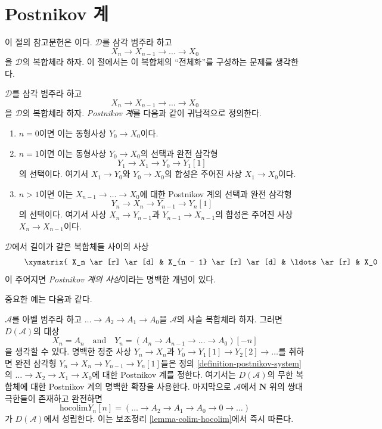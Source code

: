 \section{Postnikov 계}
\label{section-postnikov}

\noindent
이 절의 참고문헌은 \cite{Orlov-K3}이다. $\mathcal{D}$를 삼각 범주라
하고
$$
X_n \to X_{n - 1} \to \ldots \to X_0
$$
을 $\mathcal{D}$의 복합체라 하자. 이 절에서는 이 복합체의
``전체화''를 구성하는 문제를 생각한다.

\begin{definition}
\label{definition-postnikov-system}
$\mathcal{D}$를 삼각 범주라 하고
$$
X_n \to X_{n - 1} \to \ldots \to X_0
$$
을 $\mathcal{D}$의 복합체라 하자. {\it Postnikov 계}를 다음과 같이
귀납적으로 정의한다.
\begin{enumerate}
\item $n = 0$이면 이는 동형사상 $Y_0 \to X_0$이다.
\item $n = 1$이면 이는 동형사상 $Y_0 \to X_0$의 선택과 완전 삼각형
$$
Y_1 \to X_1 \to Y_0 \to Y_1[1]
$$
의 선택이다. 여기서 $X_1 \to Y_0$와 $Y_0 \to X_0$의 합성은 주어진
사상 $X_1 \to X_0$이다.
\item $n > 1$이면 이는 $X_{n - 1} \to \ldots \to X_0$에 대한
Postnikov 계의 선택과 완전 삼각형
$$
Y_n \to X_n \to Y_{n - 1} \to Y_n[1]
$$
의 선택이다. 여기서 사상 $X_n \to Y_{n - 1}$과
$Y_{n - 1} \to X_{n - 1}$의 합성은 주어진 사상
$X_n \to X_{n - 1}$이다.
\end{enumerate}
$\mathcal{D}$에서 길이가 같은 복합체들 사이의 사상
\begin{equation}
\label{equation-map-complexes}
\vcenter{
\xymatrix{
X_n \ar[r] \ar[d] &
X_{n - 1} \ar[r] \ar[d] &
\ldots \ar[r] &
X_0 \ar[d] \\
X'_n \ar[r] &
X'_{n - 1} \ar[r] &
\ldots \ar[r] &
X'_0
}
}
\end{equation}
이 주어지면 {\it Postnikov 계의 사상}이라는 명백한 개념이 있다.
\end{definition}

\noindent
중요한 예는 다음과 같다.

\begin{example}
\label{example-key-postnikov}
$\mathcal{A}$를 아벨 범주라 하고
$\ldots \to A_2 \to A_1 \to A_0$을 $\mathcal{A}$의 사슬 복합체라 하자.
그러면 $D(\mathcal{A})$의 대상
$$
X_n = A_n
\quad\text{and}\quad
Y_n = (A_n \to A_{n - 1} \to \ldots \to A_0)[-n]
$$
을 생각할 수 있다. 명백한 정준 사상 $Y_n \to X_n$과
$Y_0 \to Y_1[1] \to Y_2[2] \to \ldots$를 취하면 완전 삼각형
$Y_n \to X_n \to Y_{n - 1} \to Y_n[1]$들은 정의
\ref{definition-postnikov-system}의
$\ldots \to X_2 \to X_1 \to X_0$에 대한 Postnikov 계를 정한다.
여기서는 $D(\mathcal{A})$의 무한 복합체에 대한 Postnikov 계의
명백한 확장을 사용한다. 마지막으로 $\mathcal{A}$에서
$\mathbf{N}$ 위의 쌍대극한들이 존재하고 완전하면
$$
\text{hocolim} Y_n[n] = (\ldots \to A_2 \to A_1 \to A_0 \to 0 \to \ldots)
$$
가 $D(\mathcal{A})$에서 성립한다. 이는 보조정리
\ref{lemma-colim-hocolim}에서 즉시 따른다.
\end{example}

